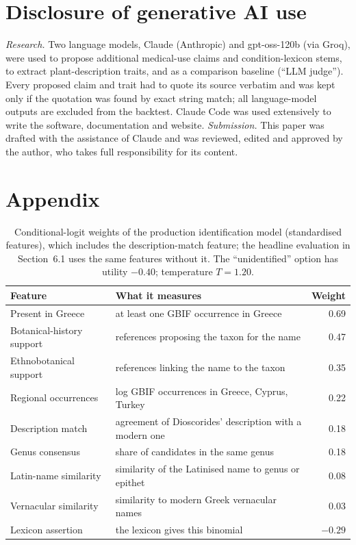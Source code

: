 \documentclass[11pt,a4paper]{article}
\begin{document}
\section*{Disclosure of generative AI use}
\small
\textit{Research.} Two language models, Claude (Anthropic) and gpt-oss-120b (via Groq), were used to propose additional medical-use claims and condition-lexicon stems, to extract plant-description traits, and as a comparison baseline (“LLM judge”). Every proposed claim and trait had to quote its source verbatim and was kept only if the quotation was found by exact string match; all language-model outputs are excluded from the backtest. Claude Code was used extensively to write the software, documentation and website. \textit{Submission.} This paper was drafted with the assistance of Claude and was reviewed, edited and approved by the author, who takes full responsibility for its content.

\normalsize



\appendix
{}
\section*{Appendix}
\renewcommand{\thetable}{A\arabic{table}}\setcounter{table}{0}

\begin{table}[h]
\centering\small
\caption{Conditional-logit weights of the production identification model (standardised features), which includes the description-match feature; the headline evaluation in Section~6.1 uses the same features without it. The “unidentified” option has utility $-0.40$; temperature $T = 1.20$.}
\label{tab:weights}
\begin{tabularx}{\linewidth}{@{}l X r@{}}
\toprule
Feature & What it measures & Weight \\
\midrule
Present in Greece & at least one GBIF occurrence in Greece & 0.69 \\
Botanical-history support & references proposing the taxon for the name & 0.47 \\
Ethnobotanical support & references linking the name to the taxon & 0.35 \\
Regional occurrences & log GBIF occurrences in Greece, Cyprus, Turkey & 0.22 \\
Description match & agreement of Dioscorides’ description with a modern one & 0.18 \\
Genus consensus & share of candidates in the same genus & 0.18 \\
Latin-name similarity & similarity of the Latinised name to genus or epithet & 0.08 \\
Vernacular similarity & similarity to modern Greek vernacular names & 0.03 \\
Lexicon assertion & the lexicon gives this binomial & $-0.29$ \\
\bottomrule
\end{tabularx}
\end{table}
\end{document}
